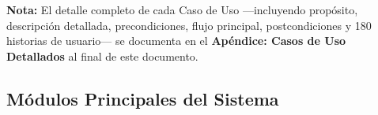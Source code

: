 ﻿\documentclass[11pt, letterpaper]{article}
\begin{document}
\medskip

\textbf{Nota:} El detalle completo de cada Caso de Uso —incluyendo propósito, descripción detallada, precondiciones, flujo principal, postcondiciones y 180 historias de usuario— se documenta en el \textbf{Apéndice: Casos de Uso Detallados} al final de este documento.








\subsection{Módulos Principales del Sistema}
\end{document}
